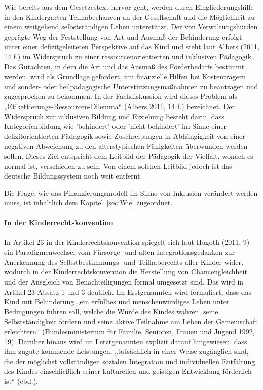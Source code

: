 Wie bereits aus dem Gesetzestext hervor geht, werden durch Eingliederungshilfe in den Kindergarten Teilhabechancen an der Gesellschaft und die Möglichkeit zu einem weitgehend selbstständigen Leben unterstützt. Der von Verwaltungshürden geprägte Weg der Feststellung von Art und Ausmaß der Behinderung erfolgt unter einer defizitgeleiteten Perspektive auf das Kind und steht laut Albers (2011, 14 f.) im Widerspruch zu einer ressourcenorientierten und inklusiven Pädagogik. Das Gutachten, in dem die Art und das Ausmaß des Förderbedarfs bestimmt werden, wird als Grundlage gefordert, um finanzielle Hilfen bei Kostenträgern und sonder- oder heilpädagogische Unterstützungsmaßnahmen zu beantragen und zugesprochen zu bekommen. In der Fachdiskussion wird dieses Problem als „Etikettierungs-Ressourcen-Dilemma“ (Albers 2011, 14 f.) bezeichnet. 
Der Widerspruch zur inklusiven Bildung und Erziehung besteht darin, dass Kategorienbildung wie 'behindert' oder 'nicht behindert' im Sinne einer defizitorientierten Pädagogik sowie Zuschreibungen in Abhängigkeit von einer negativen Abweichung zu den alterstypischen Fähigkeiten überwunden werden sollen. Dieses Ziel entspricht dem Leitbild der Pädagogik der Vielfalt, wonach es normal ist, verschieden zu sein. Von einem solchen Leitbild jedoch ist das deutsche Bildungssystem noch weit entfernt. 

Die Frage, wie das Finanzierungsmodell im Sinne von Inklusion verändert werden muss, ist inhaltlich dem Kapitel~\ref{sec:Wie} zugeordnet. 
 
\paragraph{In der Kinderrechtskonvention}
In Artikel 23 in der Kinderrechtskonvention spiegelt sich laut Hugoth (2011, 9) ein Paradigmenwechsel vom Fürsorge- und alten Integrationsgedanken zur Anerkennung des Selbstbestimmungs- und Teilhaberechts aller Kinder wider, wodurch in der Kinderrechtskonvention die Herstellung von Chancengleichheit und der Ausgleich von Benachteiligungen formal umgesetzt sind. Das wird in Artikel 23 Absatz 1 und 3 deutlich. Im Erstgenannten wird formuliert, dass das Kind mit Behinderung „ein erfülltes und menschenwürdiges Leben unter Bedingungen führen soll, welche die Würde des Kindes wahren, seine Selbstständigkeit fördern und seine aktive Teilnahme am Leben der Gemeinschaft erleichtern“ (Bundesministerium für Familie, Senioren,
Frauen und Jugend 1992, 19). Darüber hinaus wird im Letztgenannten explizit darauf hingewiesen, dass ihm zugute kommende Leistungen, „tatsächlich in einer Weise zugänglich sind, die der möglichst vollständigen sozialen Integration und individuellen Entfaltung des Kindes einschließlich seiner kulturellen und geistigen Entwicklung förderlich ist“ (ebd.). 

